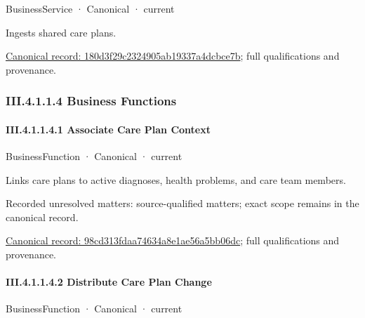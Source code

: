 \label{element:180d3f29c2324905ab19337a4dcbce7b}
{\small BusinessService · Canonical · current}\par

Ingests shared care plans.


{\footnotesize \href{../../../../../../../continuum/business/business-service/180d3f29c2324905ab19337a4dcbce7b.md}{Canonical record: 180d3f29c2324905ab19337a4dcbce7b}; full qualifications and provenance.}\par
\subsubsection*{III.4.1.1.4 Business Functions}
\label{navigation:III.4.1.1.4}

\paragraph*{III.4.1.1.4.1 Associate Care Plan Context}
\label{navigation:III.4.1.1.4.1}

\label{element:98cd313fdaa74634a8e1ae56a5bb06dc}
{\small BusinessFunction · Canonical · current}\par

Links care plans to active diagnoses, health problems, and care team members.


{\small Recorded unresolved matters: source-qualified matters; exact scope remains in the canonical record.}\par
{\footnotesize \href{../../../../../../../continuum/business/business-function/98cd313fdaa74634a8e1ae56a5bb06dc.md}{Canonical record: 98cd313fdaa74634a8e1ae56a5bb06dc}; full qualifications and provenance.}\par
\paragraph*{III.4.1.1.4.2 Distribute Care Plan Change}
\label{navigation:III.4.1.1.4.2}

\label{element:cbfa51308103418a9dffe23a2d8cfd87}
{\small BusinessFunction · Canonical · current}\par

